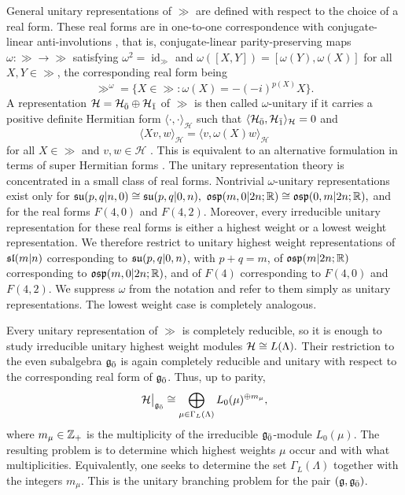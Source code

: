 General unitary representations of $\gg$ are defined with respect to the choice of a real form. These real forms are in one-to-one correspondence with conjugate-linear anti-involutions \cite{ParkerRealForms, serganova1983classification}, that is, conjugate-linear parity-preserving maps $\omega\colon\gg\to\gg$ satisfying $\omega^{2}=\operatorname{id}_{\gg}$ and 
$
\omega([X,Y])=[\omega(Y),\omega(X)]$
for all $X,Y\in\gg$, the corresponding real form being
\begin{equation}
\gg^{\omega}=\{X\in\gg:\omega(X)=-(-i)^{p(X)}X\}.
\end{equation}
A representation $\mathcal{H} = \HH_{\bar{0}}\oplus \HH_{\bar{1}}$ of $\gg$ is then called $\omega$-unitary if it carries a positive definite Hermitian form $\langle\cdot,\cdot\rangle_{\mathcal{H}}$ such that $\langle \HH_{\bar{0}},\HH_{\bar{1}}\rangle_{\HH}=0$ and 
\begin{equation}
\langle Xv,w\rangle_{\mathcal{H}}
=
\langle v,\omega(X)w\rangle_{\mathcal{H}}
\end{equation}
for all $X\in\gg$ and $v,w\in\mathcal{H}$ \cite[Definition~2.3]{jakobsen1994full}. This is equivalent to an alternative formulation in terms of super Hermitian forms \cite{SchmidtDirac, SchmidtWalcher}. 
The unitary representation theory is concentrated in a small class of real forms. Nontrivial $\omega$-unitary representations exist only for $\su(p,q\vert n,0)\cong\su(p,q\vert0,n),$ $\osp(m,0\vert2n;\RR)\cong\osp(0,m\vert2n;\RR),$ and for the real forms $F(4,0)$ and $F(4,2)$. Moreover, every irreducible unitary representation for these real forms is either a highest weight or a lowest weight representation. We therefore restrict to unitary highest weight representations of $\sl(m\vert n)$ corresponding to $\su(p,q\vert0,n)$, with $p+q=m$, of $\osp(m\vert2n;\RR)$ corresponding to $\osp(m,0\vert2n;\RR)$, and of $F(4)$ corresponding to $F(4,0)$ and $F(4,2)$. We suppress $\omega$ from the notation and refer to them simply as unitary representations. The lowest weight case is completely analogous.

Every unitary representation of $\gg$ is completely reducible, so it is enough to study irreducible unitary highest weight modules
$
\HH\cong L(\Lambda).
$
Their restriction to the even subalgebra $\even$ is again completely reducible and unitary with respect to the corresponding real form of $\even$. Thus, up to parity,
\begin{equation}
\HH\big\vert_{\even}
\cong
\bigoplus_{\mu\in\Gamma_L(\Lambda)}
L_0(\mu)^{\oplus m_\mu},
\end{equation}
where $m_\mu\in\ZZ_{+}$ is the multiplicity of the irreducible $\even$-module $L_0(\mu)$. The resulting problem is to determine which highest weights $\mu$ occur and with what multiplicities. Equivalently, one seeks to determine the set $\Gamma_L(\Lambda)$ together with the integers $m_\mu$. This is the unitary branching problem for the pair $(\gg,\even)$.



